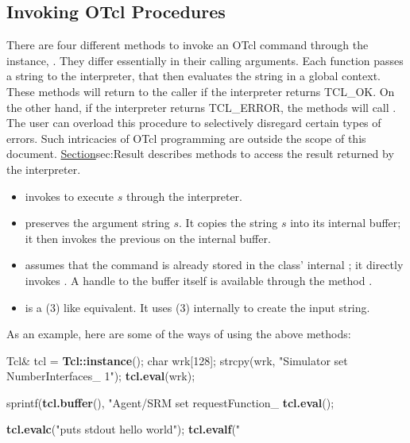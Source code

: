 \subsection{Invoking OTcl Procedures}
\label{sec:Invoke}
There are four different methods to invoke an OTcl command
through the instance, .
They differ essentially in their calling arguments.
Each function passes a string to the interpreter,
that then evaluates the string in a global context.
These methods will return to the caller if the interpreter returns TCL\_OK.
On the other hand, if the interpreter returns TCL\_ERROR,
the methods will call .
The user can overload this procedure to selectively disregard
certain types of errors.
Such intricacies of OTcl programming are outside the
scope of this document.
\href{The next section}{Section}{sec:Result}
describes methods to access the result returned by the interpreter.
\begin{itemize}\itemsep0pt
\item {}
  invokes  to execute $s$ through the interpreter.

\item {}
  preserves the argument string $s$.
  It copies the string $s$ into its internal buffer;
  it then invokes the previous  on the internal buffer.

\item {}
  assumes that the command is already stored in the class' internal
  ; it directly invokes .
  A handle to the buffer itself is available through the method
  .

\item
  is a (3) like equivalent.
  It uses (3) internally to create the input string.
\end{itemize}
As an example, here are some of the ways of using the above methods:
\begin{program}
        Tcl& tcl = {\bfseries{}Tcl::instance}();
        char wrk[128];
        strcpy(wrk, "Simulator set NumberInterfaces_ 1");
        {\bfseries{}tcl.eval}(wrk);

        sprintf({\bfseries{}tcl.buffer}(), "Agent/SRM set requestFunction_ %
        {\bfseries{}tcl.eval}();

        {\bfseries{}tcl.evalc}("puts stdout {hello world}");
        {\bfseries{}tcl.evalf}("%
\end{program}

